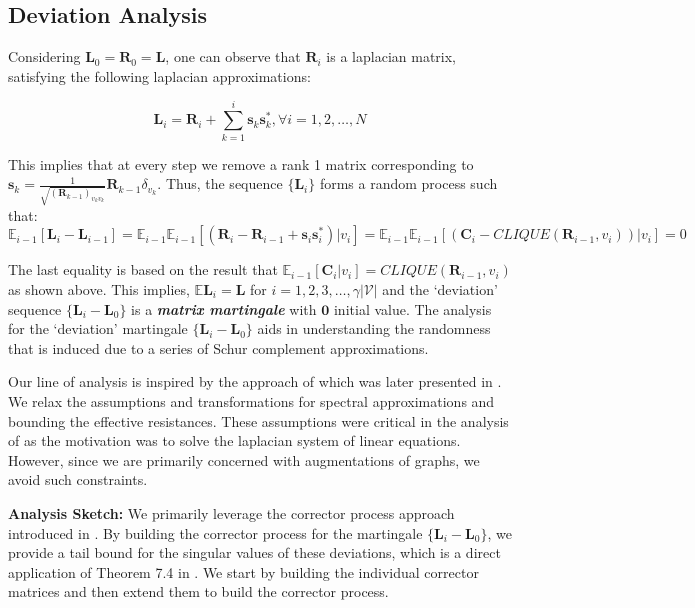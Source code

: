 \documentclass{article}
\def\mC{{\mathbf{C}}}
\def\mL{{\mathbf{L}}}
\def\mR{{\mathbf{R}}}
\def\vs{{\mathbf{s}}}
\def\gV{{\mathcal{V}}}
\theoremstyle{plain}
\theoremstyle{definition}
\theoremstyle{remark}
\begin{document}
\subsection{Deviation Analysis}

Considering $\mL_0 = \mR_0 = \mL$, one can observe that $\mR_i$ is a laplacian matrix, satisfying the following laplacian approximations:

\begin{equation}
\label{eq:L_R_relation}
\mL_i = \mR_i + \sum_{k=1}^i \vs_k \vs_k^*, \forall i = {1, 2, \dots, N}
\end{equation}

This implies that at every step we remove a rank 1 matrix corresponding to $\vs_k = \frac{1}{\sqrt{(\mR_{k-1})_{v_kv_k}}}\mR_{k-1}\delta_{v_k}$. Thus, the sequence $\{\mL_i\}$ forms a random process such that:
\begin{equation}
\label{eq:lap_clique_diff_seq}
\mathbb{E}_{i-1}[\mL_i - \mL_{i-1}] = \mathbb{E}_{i-1}\mathbb{E}_{i-1}[(\mR_i - \mR_{i-1} + \vs_i \vs_i^*) |v_i] = \mathbb{E}_{i-1}\mathbb{E}_{i-1}[(\mC_i - \textit{CLIQUE}(\mR_{i-1},v_i)) |v_i] =  0 
\end{equation}

The last equality is based on the result that $\mathbb{E}_{i-1}[\mC_i | v_i] = \textit{CLIQUE}(\mR_{i-1}, v_i)$ as shown above. This implies, $\mathbb{E}\mL_i = \mL$ for $i = 1,2,3, \dots, \gamma|\gV|$ and the `deviation' sequence $\{\mL_i - \mL_0\}$ is a \textit{\textbf{matrix martingale}} with $\textbf{0}$ initial value. The analysis for the `deviation' martingale $\{\mL_i - \mL_0\}$ aids in understanding the randomness that is induced due to a series of Schur complement approximations.


Our line of analysis is inspired by the approach of \citet{kyng2016approximate} which was later presented in \citet{tropp2019matrix}. We relax the assumptions and transformations for spectral approximations and bounding the effective resistances. These assumptions were critical in the analysis of \citet{kyng2016approximate, tropp2019matrix} as the motivation was to solve the laplacian system of linear equations. However, since we are primarily concerned with augmentations of graphs, we avoid such constraints.

\textbf{Analysis Sketch:} We primarily leverage the corrector process approach introduced in \citet{tropp2019matrix}. By building the corrector process for the martingale $\{\mL_i - \mL_0\}$, we provide a tail bound for the singular values of these deviations, which is a direct application of Theorem 7.4 in \citet{tropp2019matrix}. We start by building the individual corrector matrices and then extend them to build the corrector process.
\end{document}
